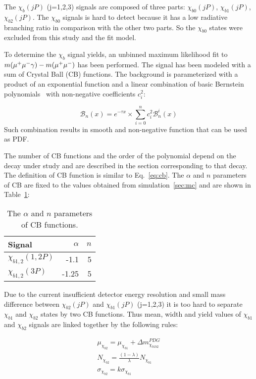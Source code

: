 The $\chi_b(jP)$ (j=1,2,3) signals are composed of three parts: $\chi_{b0}(jP)$,
$\chi_{b1}(jP)$, $\chi_{b2}(jP)$. The $\chi_{b0}$ signals is hard to detect
because it has a low radiative branching ratio in comparison with the other two
parts. So the $\chi_{b0}$ states were excluded from this study and the fit
model.

To determine the $\chi_b$ signal yields, an unbinned maximum likelihood fit to
$m(\mu^+\mu^-\gamma) - m(\mu^+\mu^-)$ has been performed. The signal has been modeled with
a sum of Crystal Ball (CB)  functions. The background is parameterized with a
product of an exponential function and a linear combination of basic Bernstein
polynomials~\cite{Phillips:2003} with non-negative coefficients $c_{i}^2$:

\begin{equation}
\label{eq:bernstein}
{\mathscr B}_{n}(x) = e^{-\tau x} \times \sum_{i=0}^{n} c_{i}^2 {\mathscr B}_{n}^{i}(x)
\end{equation}
Such combination results in smooth and non-negative function that can be used as
PDF.


The number of CB functions and the order of the polynomial depend on the decay
under study and are described in the section corresponding to that decay. The
definition of CB function is similar to Eq.~\ref{eq:cb}. The $\alpha$ and $n$
parameters of CB are fixed to the values obtained from simulation~\ref{sec:mc}
and are shown in Table~\ref{tab:chib:fit:tail}:

\begin{table}[H]
\caption{\small   The $\alpha$ and $n$ parameters of CB functions.}
\centering
\begin{tabular}{lrr}
\toprule
Signal & $\alpha$ & $n$ \\
\midrule
$\chi_{b1,2}(1,2P)$ & -1.1 & 5 \\
$\chi_{b1,2}(3P)$ & -1.25 & 5 \\
\bottomrule
\end{tabular}
\label{tab:chib:fit:tail}
\end{table}

Due to the current insufficient detector energy resolution and small mass
difference between $\chi_{b2}(jP)$ and $\chi_{b1}(jP)$ (j=1,2,3) it is too hard
to separate $\chi_{b1}$ and $\chi_{b2}$ states by two CB functions. Thus mean,
width and yield values of  $\chi_{b1}$ and $\chi_{b2}$ signals are linked
together by the following rules:

\begin{equation}
  \begin{aligned}
\mu_{\chi_{b2}} = \mu_{\chi_{b1}} + \Delta m_{\chi_{b1b2}}^{PDG} \\
N_{\chi_{b2}} = \frac{(1-\lambda)}{\lambda} N_{\chi_{b1}} \\
\sigma_{\chi_{b2}} = k \sigma_{\chi_{b1}}
  \end{aligned}
\end{equation}

